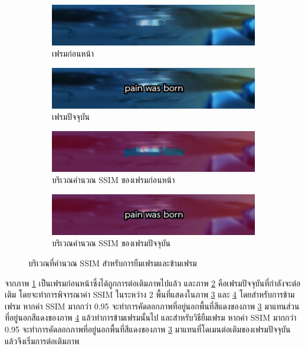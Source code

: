 \documentclass[hidelinks, a4paper,12pt]{article}
\numberwithin{equation}{section}							%
\numberwithin{equation}{section}
\begin{document}
{	\begin{figure}[H]
		\centering
		\begin{subfigure}{0.4\linewidth}
			\centering
			\includegraphics[width=0.8\linewidth]{images/skipborrow/prevframe.png}
			\caption{เฟรมก่อนหน้า}
			\label{image:ssim_location_prev}
		\end{subfigure}
		\begin{subfigure}{0.4\linewidth}
			\centering
			\includegraphics[width=0.8\linewidth]{images/skipborrow/currentframe.png}
			\caption{เฟรมปัจจุบัน}
			\label{image:ssim_location_curr}
		\end{subfigure}
		\bigskip
		\begin{subfigure}{0.4\linewidth}
			\centering
			\includegraphics[width=0.8\linewidth]{images/skipborrow/prevframeinverse.png}
			\caption{บริเวณคำนวณ SSIM ของเฟรมก่อนหน้า}
			\label{image:ssim_location_prev_inv}
		\end{subfigure}
		\begin{subfigure}{0.4\linewidth}
			\centering
			\includegraphics[width=0.8\linewidth]{images/skipborrow/currentframeinverse.png}
			\caption{บริเวณคำนวณ SSIM ของเฟรมปัจจุบัน}
			\label{image:ssim_location_curr_inv}
		\end{subfigure}
		\caption{บริเวณที่คำนวณ SSIM สำหรับการยืมเฟรมและข้ามเฟรม}
		\label{image:ssim_location}
	\end{figure}
	\hspace{1cm} จากภาพ \ref{image:ssim_location_prev} เป็นเฟรมก่อนหน้าซึ่งได้ถูกการต่อเติมภาพไปแล้ว และภาพ \ref{image:ssim_location_curr} คือเฟรมปัจจุบันที่กำลังจะต่อเติม โดยจะทำการพิจารณาค่า SSIM ในระหว่าง 2 พื้นที่แสดงในภาพ \ref{image:ssim_location_prev_inv} และ \ref{image:ssim_location_curr_inv} โดยสำหรับการข้ามเฟรม หากค่า SSIM มากกว่า 0.95 จะทำการคัดลอกภาพที่อยู่นอกพื้นที่สีแดงของภาพ \ref{image:ssim_location_prev_inv} มาแทนส่วนที่อยู่นอกสีแดงของภาพ \ref{image:ssim_location_curr_inv}  แล้วทำการข้ามเฟรมนั้นไป และสำหรับวิธียืมเฟรม หากค่า SSIM มากกว่า 0.95 จะทำการคัดลอกภาพที่อยู่นอกพื้นที่สีแดงของภาพ \ref{image:ssim_location_prev_inv} มาแทนที่โดเมนต่อเติมของเฟรมปัจจุบันแล้วจึงเริ่มการต่อเติมภาพ
	
}
\end{document}
